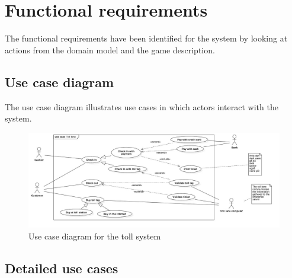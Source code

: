 \section{Functional requirements}
The functional requirements have been identified for the system by looking at actions from the domain model and the game description.

\subsection{Use case diagram}
The use case diagram illustrates use cases in which actors interact with the system.

\begin{figure}[!ht]
  \begin{center}
    \includegraphics[width=1\textwidth]{figures/use_case_diagram.jpg} 
  \end{center}
  \caption{Use case diagram for the toll system}
\end{figure}

\subsection{Detailed use cases}




